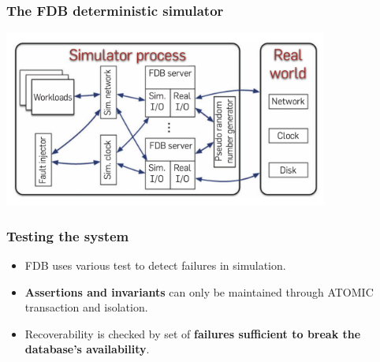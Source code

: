 
\begin{frame}
    \frametitle{The FDB deterministic simulator}
    \begin{center}
        \includegraphics[width=0.8\textwidth]{img/3-Testing/The FDB deterministic simulator.png}
    \end{center}
    
\end{frame}


\begin{frame}
    \frametitle{Testing the system}
    \begin{itemize}
        \item FDB uses various test to detect failures in simulation.
        \item \textbf{Assertions and invariants} can only be maintained through ATOMIC transaction and isolation.
        \item Recoverability is checked by set of \textbf{failures sufficient to break
the database’s availability}.
    \end{itemize}
\end{frame}


